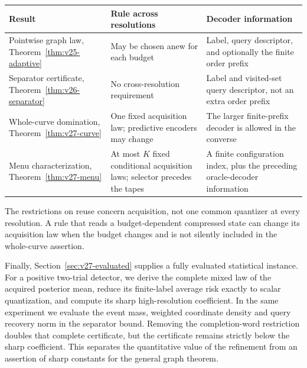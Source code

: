 \begin{center}
\small
\begin{tabular}{@{}p{}p{}p{}@{}}
\toprule
Result & Rule across resolutions & Decoder information \\
\midrule
Pointwise graph law, Theorem~\ref{thm:v25-adaptive} & May be chosen anew for each budget & Label, query descriptor, and optionally the finite order prefix \\
Separator certificate, Theorem~\ref{thm:v26-separator} & No cross-resolution requirement & Label and visited-set query descriptor, not an extra order prefix \\
Whole-curve domination, Theorem~\ref{thm:v27-curve} & One fixed acquisition law; predictive encoders may change & The larger finite-prefix decoder is allowed in the converse \\
Menu characterization, Theorem~\ref{thm:v27-menu} & At most $K$ fixed conditional acquisition laws; selector precedes the tapes & A finite configuration index, plus the preceding oracle-decoder information \\
\bottomrule
\end{tabular}
\end{center}

The restrictions on reuse concern acquisition, not one common quantizer at every resolution. A rule that reads a budget-dependent compressed state can change its acquisition law when the budget changes and is not silently included in the whole-curve assertion.

Finally, Section~\ref{sec:v27-evaluated} supplies a fully evaluated statistical instance. For a positive two-trial detector, we derive the complete mixed law of the acquired posterior mean, reduce its finite-label average risk exactly to scalar quantization, and compute its sharp high-resolution coefficient. In the same experiment we evaluate the event mass, weighted coordinate density and query recovery norm in the separator bound. Removing the completion-word restriction doubles that complete certificate, but the certificate remains strictly below the sharp coefficient. This separates the quantitative value of the refinement from an assertion of sharp constants for the general graph theorem.
